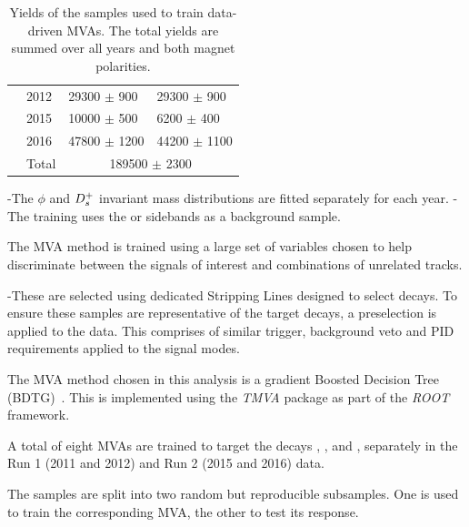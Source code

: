 \begin{table}[!h]
\begin{center}
\begin{tabular}{llll}
                                    & 2012   & 29300 $\pm$ 900    & 29300 $\pm$ 900 \\
                                    & 2015   & 10000 $\pm$ 500    & 6200  $\pm$ 400 \\
                                    & 2016   & 47800 $\pm$ 1200   & 44200 $\pm$ 1100 \\
                                    & Total  & \multicolumn{2}{c}{189500 $\pm$ 2300}\\
         \hline
      \end{tabular}
      \caption{Yields of the samples used to train data-driven MVAs. The total yields are summed over all years and both magnet polarities.}
      \label{table:mva_training_yields}
   \end{center}
\end{table}




{\color{Blue}
-The $\phi$ and ${{D}^+_{s}}$ invariant mass distributions are fitted separately for each year. 
- The training uses the \phiz or \Dsp sidebands as a background sample.
}

The MVA method is trained using a large set of variables chosen to help discriminate between the signals of interest and combinations of unrelated tracks.

{\color{Blue}

-These are selected using dedicated Stripping Lines designed to select decays. To ensure these samples are representative of the target decays, a preselection is applied to the data. This comprises of similar trigger, background veto and PID requirements applied to the signal modes.
}

The MVA method chosen in this analysis is a gradient Boosted Decision Tree (BDTG)~\cite{Breiman}. This is implemented using the \emph{TMVA} package as part of the \emph{ROOT} framework. 


A total of eight MVAs are trained to target the decays \decay{\phi}{\Kp\Km}, \decay{\Dsp}{\Kp\Km\pip}, \decay{\Dsp}{\Kp\pim\pip} and \decay{\Dsp}{\pip\pim\pip}, separately in the Run 1 (2011 and 2012) and Run 2 (2015 and 2016) data.

The samples are split into two random but reproducible subsamples. One is used to train the corresponding MVA, the other to test its response. 




